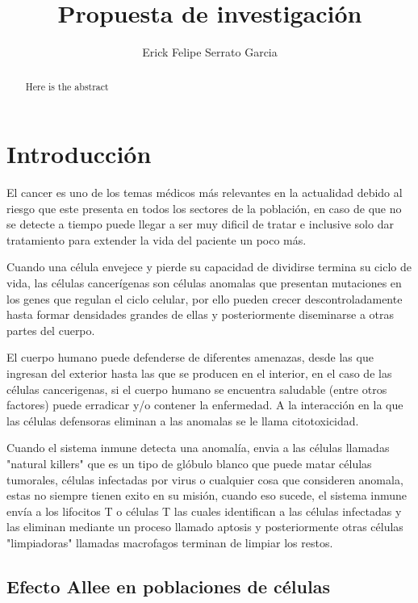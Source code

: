 \documentclass{article}
\title{Propuesta de investigación}
\author{Erick Felipe Serrato Garcia}
\begin{document}
\maketitle

\begin{abstract}
Here is the abstract
\end{abstract}

\section{Introducción}

El cancer es uno de los temas médicos más relevantes en la actualidad debido al riesgo que este presenta en todos los sectores de la población, en caso de que no se detecte a tiempo puede llegar a ser muy dificil de tratar e inclusive solo dar tratamiento para extender la vida del paciente un poco más.

Cuando una célula envejece y pierde su capacidad de dividirse termina su ciclo de vida, las células cancerígenas son células anomalas que presentan mutaciones en los genes que regulan el ciclo celular, por ello pueden crecer descontroladamente hasta formar densidades grandes de ellas y posteriormente diseminarse a otras partes del cuerpo.

El cuerpo humano puede defenderse de diferentes amenazas, desde las que ingresan del exterior hasta las que se producen en el interior, en el caso de las células cancerigenas, si el cuerpo humano se encuentra saludable (entre otros factores) puede erradicar y/o contener la enfermedad. A la interacción en la que las células defensoras eliminan a las anomalas se le llama citotoxicidad.

Cuando el sistema inmune detecta una anomalía, envia a las células llamadas "natural killers" que es un tipo de glóbulo blanco que puede matar células tumorales, células infectadas por virus o cualquier cosa que consideren anomala, estas no siempre tienen exito en su misión, cuando eso sucede, el sistema inmune envía a los lifocitos T o células T las cuales identifican a las células infectadas y las eliminan mediante un proceso llamado aptosis y posteriormente otras células "limpiadoras" llamadas macrofagos terminan de limpiar los restos.

\subsection{Efecto Allee en poblaciones de células}
\end{document}
